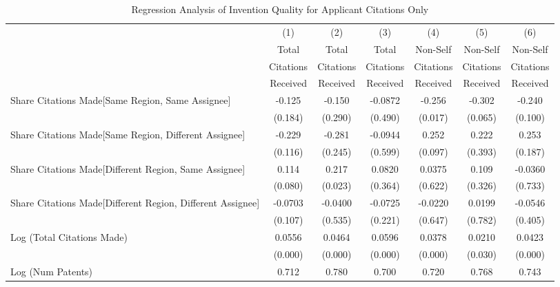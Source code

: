 \begin{table}[htbp]\centering \caption{Regression Analysis of Invention Quality for Applicant Citations Only \label{a.model123192021}}
\scriptsize
\singlespacing
\begin{tabular}{l*{6}{c}} \hline
                &\multicolumn{1}{c}{(1)}&\multicolumn{1}{c}{(2)}&\multicolumn{1}{c}{(3)}&\multicolumn{1}{c}{(4)}&\multicolumn{1}{c}{(5)}&\multicolumn{1}{c}{(6)}\\
                &\multicolumn{1}{c}{Total}&\multicolumn{1}{c}{Total}&\multicolumn{1}{c}{Total}&\multicolumn{1}{c}{Non-Self}&\multicolumn{1}{c}{Non-Self}&\multicolumn{1}{c}{Non-Self}\\
                &\multicolumn{1}{c}{Citations}&\multicolumn{1}{c}{Citations}&\multicolumn{1}{c}{Citations}&\multicolumn{1}{c}{Citations}&\multicolumn{1}{c}{Citations}&\multicolumn{1}{c}{Citations}\\
                 &\multicolumn{1}{c}{Received}&\multicolumn{1}{c}{Received}&\multicolumn{1}{c}{Received}&\multicolumn{1}{c}{Received}&\multicolumn{1}{c}{Received}&\multicolumn{1}{c}{Received}\\
\hline
Share Citations Made[Same Region, Same Assignee]&   -0.125&   -0.150&  -0.0872&   -0.256&   -0.302&   -0.240\\
                &  (0.184)&  (0.290)&  (0.490)&  (0.017)&  (0.065)&  (0.100)\\
Share Citations Made[Same Region, Different Assignee]&   -0.229&   -0.281&  -0.0944&    0.252&    0.222&    0.253\\
                &  (0.116)&  (0.245)&  (0.599)&  (0.097)&  (0.393)&  (0.187)\\
Share Citations Made[Different Region, Same Assignee]&    0.114&    0.217&   0.0820&   0.0375&    0.109&  -0.0360\\
                &  (0.080)&  (0.023)&  (0.364)&  (0.622)&  (0.326)&  (0.733)\\
Share Citations Made[Different Region, Different Assignee]&  -0.0703&  -0.0400&  -0.0725&  -0.0220&   0.0199&  -0.0546\\
                &  (0.107)&  (0.535)&  (0.221)&  (0.647)&  (0.782)&  (0.405)\\
Log (Total Citations Made)&   0.0556&   0.0464&   0.0596&   0.0378&   0.0210&   0.0423\\
                &  (0.000)&  (0.000)&  (0.000)&  (0.000)&  (0.030)&  (0.000)\\
Log (Num Patents)&    0.712&    0.780&    0.700&    0.720&    0.768&    0.743\\

\end{tabular}
\end{table}
